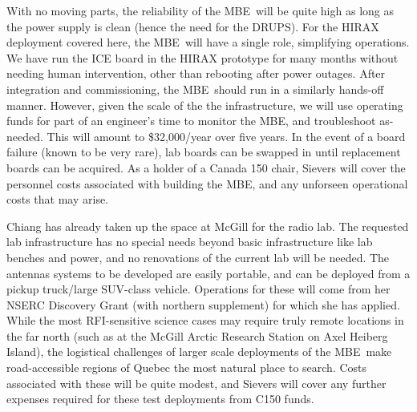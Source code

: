 \documentclass[letterpaper,11pt,preprint]{aastex}
\makeatletter
\newcommand{\mbe}{{\rm MBE}}
\def\section{\@startsection {section}{1}{\z@}{1.0ex plus 
1ex minus .2ex}{.2ex plus .2ex}{\large\bf}}
\makeatother
\begin{document}
With no moving parts, the reliability of the \mbe\ will be quite high
as long as the power supply is clean (hence the need for the DRUPS).
For the HIRAX deployment covered here, the \mbe\ will have a single
role, simplifying operations.  We have run the ICE board in the HIRAX
prototype for many months without needing human intervention, other
than rebooting after power outages.  After integration and
commissioning, the \mbe\ should run in a similarly hands-off manner.
However, given the scale of the the infrastructure, we will use
operating funds for part of an engineer's time to monitor the \mbe,
and troubleshoot as-needed.  This will amount to \$32,000/year over
five years.  In the event of a board failure (known to
be very rare), lab boards can be swapped in until replacement boards
can be acquired.  As a holder of a Canada 150 chair, Sievers will
cover the personnel costs associated with building the \mbe, and any
unforseen operational costs that may arise.

Chiang has already taken up the space at McGill for the radio lab.
The requested lab infrastructure has no special needs beyond basic
infrastructure like lab benches and power, and no renovations of the
current lab will be needed.  The antennas systems to be developed are
easily portable, and can be deployed from a pickup truck/large
SUV-class vehicle.  Operations for these will come from her NSERC
Discovery Grant (with northern supplement) for which she has applied.
While the most RFI-sensitive science cases may require truly remote
locations in the far north (such as at the McGill Arctic Research
Station on Axel Heiberg Island), the logistical challenges of larger
scale deployments of the \mbe\ make road-accessible regions of Quebec
the most natural place to search.  Costs associated with these will be
quite modest, and Sievers will cover any further expenses required for
these test deployments from C150 funds.


\section{Benefits to Canada}
\end{document}
